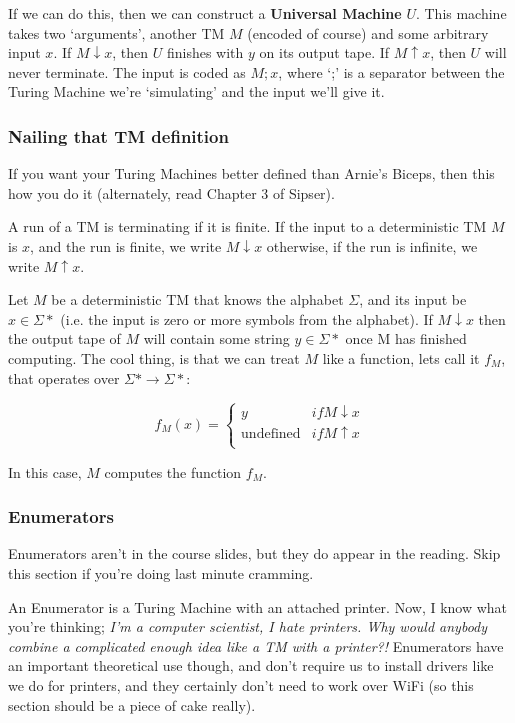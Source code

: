 If we can do this, then we can construct a \textbf{Universal Machine} $U$. This
machine takes two `arguments', another TM $M$ (encoded of course) and some
arbitrary input $x$. If $M \downarrow x$, then $U$ finishes with $y$ on its
output tape. If $M \uparrow x$, then $U$ will never terminate. The input is
coded as $M;x$, where `;' is a separator between the Turing Machine we're
`simulating' and the input we'll give it.

\subsubsection{Nailing that TM definition}

If you want your Turing Machines better defined than Arnie's Biceps, then this
how you do it (alternately, read Chapter 3 of Sipser).


A run of a TM is terminating if it is finite. If the input to a deterministic TM
$M$ is $x$, and the run is finite, we write $M \downarrow x$ otherwise, if the
run is infinite, we write $M \uparrow x$.

Let $M$ be a deterministic TM that knows the alphabet $\Sigma$, and its input be
$x \in \Sigma*$ (i.e. the input is zero or more symbols from the alphabet). If
$M \downarrow x$ then the output tape of $M$ will contain some string $y \in
\Sigma*$ once M has finished computing. The cool thing, is that we can treat $M$
like a function, lets call it $f_M$, that operates over $\Sigma* \rightarrow
\Sigma*$:

\[
  f_M(x) = \begin{cases}
       y & if M \downarrow x\\
       \text{undefined} & if M \uparrow x\\
     \end{cases}
\]

In this case, $M$ computes the function $f_M$.

\subsubsection{Enumerators}

Enumerators aren't in the course slides, but they do appear in the reading. Skip
this section if you're doing last minute cramming.

An Enumerator is a Turing Machine with an attached printer. Now, I know what
you're thinking; \textit{I'm a computer scientist, I hate printers. Why would
anybody combine a complicated enough idea like a TM with a printer?!}
Enumerators have an important theoretical use though, and don't require us to
install drivers like we do for printers, and they certainly don't need to work
over WiFi (so this section should be a piece of cake really).

